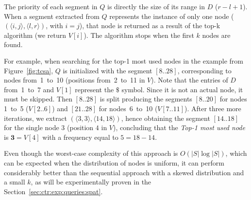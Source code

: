\begin{itemize}
\begin{itemize}
	The priority of each segment in $Q$ is
	directly the size of its range in $D$ ($r-l+1$). 
	When a segment extracted from $Q$ represents the instance of only one node ($(\langle i,j\rangle, \langle l,r\rangle)$, with $i=j$),
	that node is returned as a result of the top-k algorithm (we return $V[i]$). The algorithm stops when the first $k$ nodes are found.

	For example, when searching for the top-1 most used nodes in the example from Figure~\ref{fig:tcsa}, $Q$ is initialized with
	the segment $[8..28]$, corresponding to nodes from~1~to~10 (positions from~2~to~11 in $V$). Note
	that the entries of $D$ from~1~to~7 and $V[1]$ represent the $\$$ symbol. Since it is not an actual node, it
	 must be skipped. Then $[8..28]$ is split producing the segments $[8..20]$ for nodes 1~to~5 ($V[2..6]$)
	and $[21..28]$ for nodes~6~to~10 ($V[7..11]$). After three more iterations, we extract
	$(\langle 3,3\rangle, \langle 14,18\rangle)$, hence obtaining the segment $[14..18]$ for
	the single node 3 (position $4$ in $V$), concluding that the  {\em Top-1 most used node} is 
	$\mathbf{3}=V[4]$ with a frequency equal to $5=18-14$.
	
	Even though the worst-case complexity of this approach is $O(|S|\log|S|)$, which can be expected when the distribution of nodes is uniform, it can perform considerably better than the sequential approach with a skewed distribution and a small $k$, as will be experimentally proven in the Section~\ref{sec:ctr:exp:queries:spat}.




\end{itemize}
\end{itemize}
